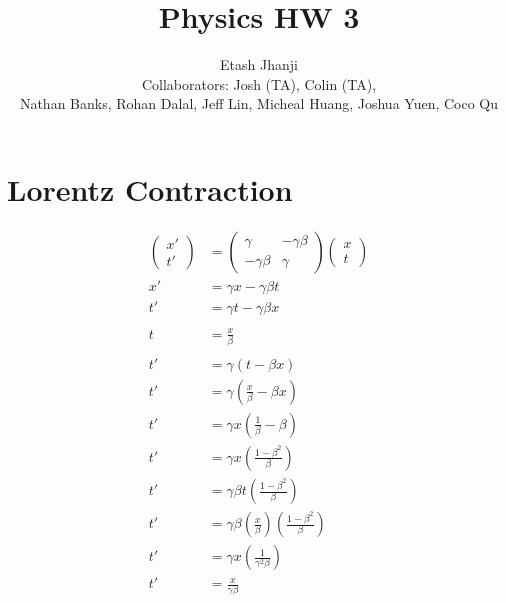 \documentclass[11pt,letterpaper, twocolumn]{article}
\author{Etash Jhanji\\\small Collaborators: Josh (TA), Colin (TA), \\\small Nathan Banks, Rohan Dalal, Jeff Lin, Micheal Huang, Joshua Yuen, Coco Qu}
\title{Physics HW 3}
\begin{document}
\maketitle

\section{Lorentz Contraction}
\begin{align*}
    \begin{pmatrix}x'\\t'\end{pmatrix} &= \begin{pmatrix}\gamma & -\gamma\beta\\ -\gamma\beta & \gamma\end{pmatrix}\begin{pmatrix}x\\t\end{pmatrix} \\
    x'&= \gamma x - \gamma\beta t\\
    t'&= \gamma t - \gamma\beta x\\\\
    t &= \frac{x}{\beta}\\\\
    t' &= \gamma (t-\beta x)\\
    t' &= \gamma \left(\frac{x}{\beta} - \beta x\right)\\
    t' &= \gamma x \left(\frac{1}{\beta} - \beta \right)\\
    t' &= \gamma x \left(\frac{1-\beta^2}{\beta}\right)\\
    t' &= \gamma \beta t \left(\frac{1-\beta^2}{\beta}\right)\\
    t' &= \gamma \beta \left(\frac{x}{\beta}\right) \left(\frac{1-\beta^2}{\beta}\right)\\
    t' &= \gamma x \left(\frac{1}{\gamma^2\beta}\right)\\
    t' &= \frac{x}{\gamma\beta}
\end{align*}
\end{document}
